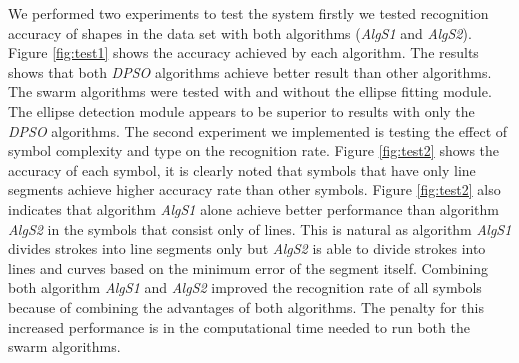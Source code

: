 \documentclass[a4paper,10pt]{IEEEconf}
\begin{document}
We performed two experiments to test the system firstly we tested recognition accuracy of shapes in the data set with both algorithms (\textsl{AlgS1} and \textsl{AlgS2}). %
  Figure \ref{fig:test1} shows the accuracy achieved by each algorithm. The results shows that both \textit{DPSO} algorithms achieve better result than other algorithms. The swarm algorithms were tested with and without the ellipse fitting module. The ellipse detection module appears to be superior to results with only the \textit{DPSO} algorithms.
The second experiment we implemented is testing the effect of symbol complexity and type on the recognition rate. Figure \ref{fig:test2} shows the accuracy of each symbol, it is clearly noted that symbols that have only line segments achieve higher accuracy rate than other symbols. Figure \ref{fig:test2} also indicates that algorithm \textsl{AlgS1} alone achieve better performance than algorithm   \textsl{AlgS2} in the symbols that consist only of lines. This is natural as algorithm  \textsl{AlgS1} divides strokes into line segments only but \textsl{AlgS2} is able to divide strokes into lines and curves based on the minimum error of the segment itself. %
 Combining both algorithm \textsl{AlgS1} and \textsl{AlgS2} improved the recognition rate of all symbols because of combining the advantages of both algorithms. The penalty for this increased performance is in the computational time needed to run both the swarm algorithms.  \\
\end{document}
